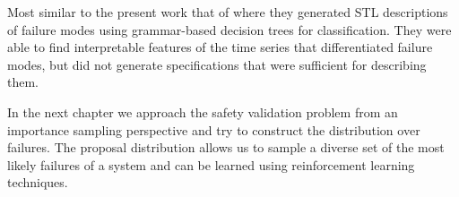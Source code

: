 Most similar to the present work that of \textcite{lee2018interpretable} where they generated STL descriptions of failure modes using grammar-based decision trees for classification. They were able to find interpretable features of the time series that differentiated failure modes, but did not generate specifications that were sufficient for describing them. 

In the next chapter we approach the safety validation problem from an importance sampling perspective and try to construct the distribution over failures. The proposal distribution allows us to sample a diverse set of the most likely failures of a system and can be learned using reinforcement learning techniques. 